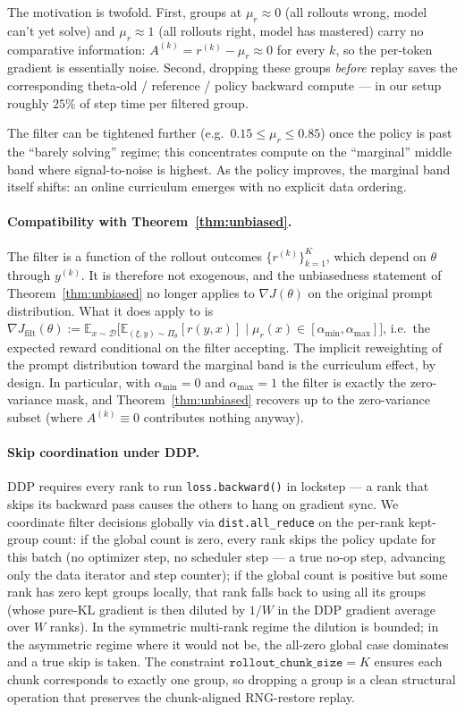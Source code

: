 \documentclass[11pt]{article}
\theoremstyle{definition}
\theoremstyle{remark}
\newcommand{\E}{\mathbb{E}}
\newcommand{\D}{\mathcal{D}}
\begin{document}
The motivation is twofold.  First, groups at $\mu_r \approx 0$ (all
rollouts wrong, model can't yet solve) and $\mu_r \approx 1$ (all
rollouts right, model has mastered) carry no comparative information:
$A^{(k)} = r^{(k)} - \mu_r \approx 0$ for every $k$, so the per-token
gradient is essentially noise.  Second, dropping these groups
\emph{before} replay saves the corresponding theta-old / reference /
policy backward compute --- in our setup roughly $25\%$ of step time per
filtered group.

The filter can be tightened further (e.g.\ $0.15 \le \mu_r \le 0.85$) once
the policy is past the ``barely solving'' regime; this concentrates
compute on the ``marginal'' middle band where signal-to-noise is highest.
As the policy improves, the marginal band itself shifts: an online
curriculum emerges with no explicit data ordering.

\paragraph{Compatibility with Theorem~\ref{thm:unbiased}.}
The filter is a function of the rollout outcomes
$\{r^{(k)}\}_{k=1}^K$, which depend on $\theta$ through $y^{(k)}$.  It is
therefore not exogenous, and the unbiasedness statement of
Theorem~\ref{thm:unbiased} no longer applies to $\nabla J(\theta)$ on the
original prompt distribution.  What it does apply to is
$\nabla J_{\mathrm{filt}}(\theta) :=
   \E_{x \sim \D}\big[ \E_{(\xi,y)\sim\Pi_\theta}[r(y,x)] \;\big|\;
   \mu_r(x) \in [\alpha_{\min},\alpha_{\max}] \big]$,
i.e.\ the expected reward conditional on the filter accepting.  The
implicit reweighting of the prompt distribution toward the marginal
band is the curriculum effect, by design.  In particular, with
$\alpha_{\min} = 0$ and $\alpha_{\max} = 1$ the filter is exactly the
zero-variance mask, and Theorem~\ref{thm:unbiased} recovers up to the
zero-variance subset (where $A^{(k)} \equiv 0$ contributes nothing
anyway).

\paragraph{Skip coordination under DDP.}
DDP requires every rank to run \texttt{loss.backward()} in lockstep --- a
rank that skips its backward pass causes the others to hang on gradient
sync.  We coordinate filter decisions globally via
\texttt{dist.all\_reduce} on the per-rank kept-group count: if the global
count is zero, every rank skips the policy update for this batch (no
optimizer step, no scheduler step --- a true no-op step, advancing only
the data iterator and step counter); if the global count is positive but
some rank has zero kept groups locally, that rank falls back to using
all its groups (whose pure-KL gradient is then diluted by $1/W$ in the
DDP gradient average over $W$ ranks).  In the symmetric multi-rank
regime the dilution is bounded; in the asymmetric regime where it would
not be, the all-zero global case dominates and a true skip is taken.
The constraint
$\texttt{rollout\_chunk\_size} = K$ ensures each chunk corresponds to
exactly one group, so dropping a group is a clean structural operation
that preserves the chunk-aligned RNG-restore replay.
\end{document}
